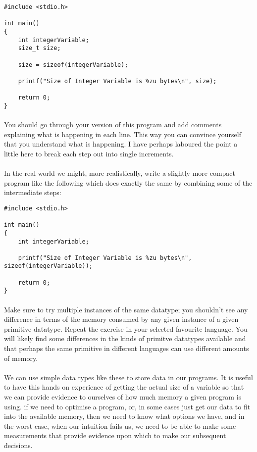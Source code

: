\documentclass[10pt, a4paper, twosize]{article}
\begin{document}
\begin{lstlisting}
#include <stdio.h>

int main()
{
    int integerVariable;
    size_t size;

    size = sizeof(integerVariable);
    
    printf("Size of Integer Variable is %zu bytes\n", size);

    return 0;
}
\end{lstlisting}

\paragraph{} You should go through your version of this program and add comments explaining what is happening in each line. This way you can convince yourself that you understand what is happening. I have perhaps laboured the point a little here to break each step out into single increments.

\paragraph{} In the real world we might, more realistically, write a slightly more compact program like the following which does exactly the same by combining some of the intermediate steps:

\begin{lstlisting}
#include <stdio.h>

int main()
{
    int integerVariable;

    printf("Size of Integer Variable is %zu bytes\n", sizeof(integerVariable));

    return 0;
}
\end{lstlisting}

\paragraph{} Make sure to try multiple instances of the same datatype; you shouldn't see any difference in terms of the memory consumed by any given instance of a given primitive datatype. Repeat the exercise in your selected favourite language. You will likely find some differences in the kinds of primitve datatypes available and that perhaps the same primitive in different languages can use different amounts of memory.

\paragraph{} We can use simple data types like these to store data in our programs. It is useful to have this hands on experience of getting the actual size of a variable so that we can provide evidence to ourselves of how much memory a given program is using. if we need to optimise a program, or, in some cases just get our data to fit into the available memory, then we need to know what options we have, and in the worst case, when our intuition fails us, we need to be able to make some measurements that provide evidence upon which to make our subsequent decisions.
\end{document}
